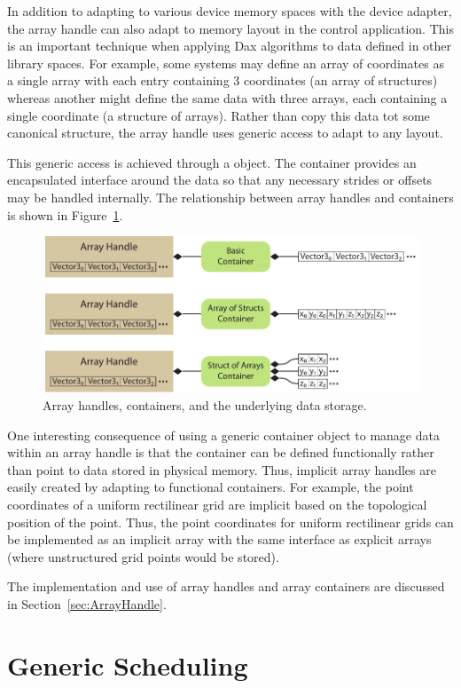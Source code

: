 In addition to adapting to various device memory spaces with the device
adapter, the array handle can also adapt to memory layout in the control
application. This is an important technique when applying Dax algorithms to
data defined in other library spaces. For example, some systems may define
an array of coordinates as a single array with each entry containing 3
coordinates (an array of structures) whereas another might define the same
data with three arrays, each containing a single coordinate (a structure of
arrays). Rather than copy this data tot some canonical structure, the array
handle uses generic access to adapt to any layout.


This generic access is achieved through a 
 object. The container provides an encapsulated
interface around the data so that any necessary strides or offsets may be
handled internally. The relationship between array handles and containers
is shown in Figure~\ref{fig:Containers}.

\begin{figure}[htb]
  \centering
  \includegraphics{images/Containers}
  \caption{Array handles, containers, and the underlying data storage.}
  \label{fig:Containers}
\end{figure}

One interesting consequence of using a generic container object to manage
data within an array handle is that the container can be defined
functionally rather than point to data stored in physical memory. Thus,
implicit array handles are easily created by adapting to functional
containers. For example, the point coordinates of a uniform rectilinear
grid are implicit based on the topological position of the point. Thus, the
point coordinates for uniform rectilinear grids can be implemented as an
implicit array with the same interface as explicit arrays (where
unstructured grid points would be stored).

The implementation and use of array handles and array containers are
discussed in Section~\ref{sec:ArrayHandle}.


\section{Generic Scheduling}
\label{sec:GenericScheduling}


